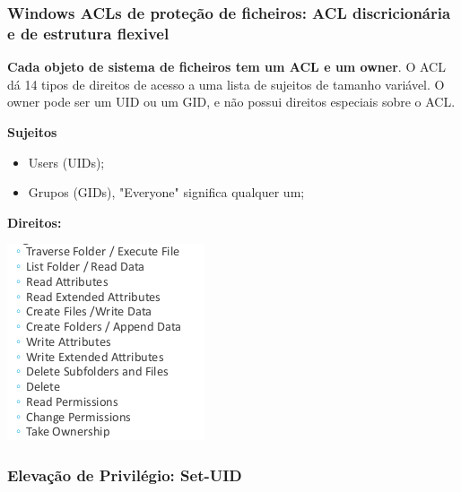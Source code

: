 \documentclass{article}
\begin{document}
\subsubsection{Windows ACLs de proteção de ficheiros: ACL discricionária e de estrutura flexivel}

\begin{flushleft}
  \textbf{Cada objeto de sistema de ficheiros tem um ACL e um owner}.
  O ACL dá 14 tipos de direitos de acesso a uma lista de sujeitos de
  tamanho variável. O owner pode ser um UID ou um GID, e não possui
  direitos especiais sobre o ACL.

  \vspace{2mm}

  \textbf{Sujeitos}
  \begin{itemize}
    \item Users (UIDs);
    \item Grupos (GIDs), "Everyone" significa qualquer um;
  \end{itemize}

  \textbf{Direitos:}

  \vspace{2mm}

  \includegraphics[scale=0.5]{37}

\end{flushleft}

\subsubsection{Elevação de Privilégio: Set-UID}
\end{document}
